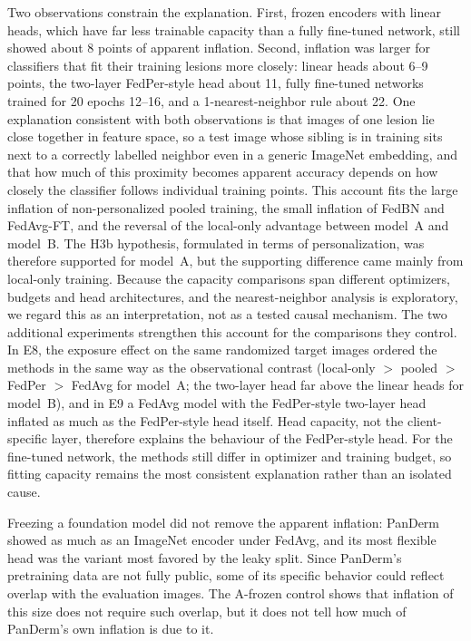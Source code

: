 \documentclass[VANCOUVER,Times1COL]{WileyNJDv5}
\begin{document}
Two observations constrain the explanation. First, frozen encoders with linear heads, which have far less
trainable capacity than a fully fine-tuned network, still showed about 8 points of apparent inflation.
Second, inflation was larger for classifiers that fit their training lesions more closely: linear heads
about 6--9 points, the two-layer FedPer-style head about 11, fully fine-tuned networks trained for 20 epochs
12--16, and a 1-nearest-neighbor rule about 22. One explanation consistent with both observations is that
images of one lesion lie close together in feature space, so a test image whose sibling is in training sits
next to a correctly labelled neighbor even in a generic ImageNet embedding, and that how much of this
proximity becomes apparent accuracy depends on how closely the classifier follows individual training
points. This account fits the large inflation of non-personalized pooled training, the small inflation of
FedBN and FedAvg-FT, and the reversal of the local-only advantage between model~A and model~B. The H3b
hypothesis, formulated in terms of personalization, was therefore supported for model~A, but the
supporting difference came mainly from local-only training. Because the capacity comparisons span
different optimizers, budgets and head architectures, and the nearest-neighbor analysis is exploratory,
we regard this as an interpretation, not as a tested causal mechanism. The two additional experiments strengthen this account for the
comparisons they control. In E8, the exposure effect on the same randomized target images ordered the
methods in the same way as the observational contrast (local-only $>$ pooled $>$ FedPer $>$ FedAvg for
model~A; the two-layer head far above the linear heads for model~B), and in E9 a FedAvg model with the
FedPer-style two-layer head inflated as much as the FedPer-style head itself. Head capacity, not the
client-specific layer, therefore explains the behaviour of the FedPer-style head. For the fine-tuned
network, the methods still differ in optimizer and training budget, so fitting capacity remains the most
consistent explanation rather than an isolated cause.

Freezing a foundation model did not remove the apparent inflation: PanDerm showed as much as an ImageNet
encoder under FedAvg, and its most flexible head was the variant most favored by the leaky split. Since
PanDerm's pretraining data are not fully public, some of its specific behavior could reflect overlap with
the evaluation images. The A-frozen control shows that inflation of this size does not require such
overlap, but it does not tell how much of PanDerm's own inflation is due to it.
\end{document}
